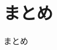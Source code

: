 \documentclass[12pt,dvipdfmx,uplatex]{beamer}
\begin{document}
\section{まとめ}
\begin{frame}
\centering
{\huge まとめ}
\end{frame}

\begin{frame}
 
\end{frame}





 

\end{document}
